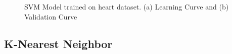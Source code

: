\documentclass[
	letterpaper, %
]{mlreport}
\begin{document}
\begin{figure}
	\centering
	\caption{SVM Model trained on heart dataset. (a) Learning Curve and (b) Validation Curve}
	\label{fig:fig11}
\end{figure}

\subsection{K-Nearest Neighbor}
\end{document}
